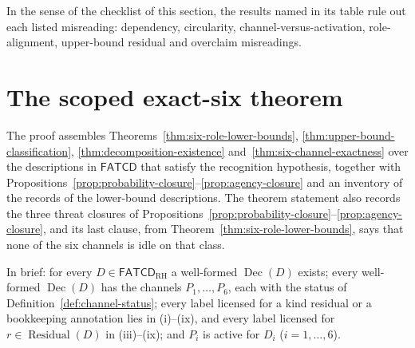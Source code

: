 \documentclass[11pt]{article}
\theoremstyle{definition}
\newcommand{\FATCD}{\ensuremath{\mathsf{FATCD}}}
\newcommand{\Dec}[1]{\ensuremath{\operatorname{Dec}\!\left(#1\right)}}
\newcommand{\Residual}[1]{\ensuremath{\operatorname{Residual}\!\left(#1\right)}}
\begin{document}
In the sense of the checklist of this section, the results named in its table
rule out each listed misreading: dependency, circularity,
channel-versus-activation, role-alignment, upper-bound residual and overclaim
misreadings.
 \section{The scoped exact-six theorem}\label{sec:scoped-exact-six}



The proof assembles Theorems~\ref{thm:six-role-lower-bounds},
\ref{thm:upper-bound-classification},
\ref{thm:decomposition-existence} and~\ref{thm:six-channel-exactness}
over the descriptions in \FATCD{} that satisfy the recognition hypothesis,
together with Propositions~\ref{prop:probability-closure}--\ref{prop:agency-closure}
and an inventory of the records of the lower-bound descriptions.
The theorem statement also records the three threat closures
of Propositions~\ref{prop:probability-closure}--\ref{prop:agency-closure},
and its last clause, from Theorem~\ref{thm:six-role-lower-bounds}, says that
none of the six channels is idle on that class.

In brief: for every \(D\in\FATCD_{\mathrm{RH}}\) a well-formed \(\Dec{D}\) exists; every well-formed \(\Dec{D}\) has the channels \(P_1,\ldots,P_6\), each with the status of Definition~\ref{def:channel-status}; every label licensed for a kind residual or a bookkeeping annotation lies in (i)--(ix), and every label licensed for \(r\in\Residual{D}\) in (iii)--(ix); and \(P_i\) is active for \(D_i\) (\(i=1,\ldots,6\)).
\end{document}

